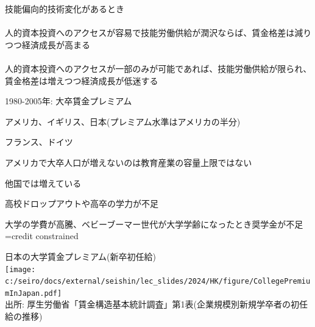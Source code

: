 \begin{frame}{}
技能偏向的技術変化があるとき\\~\\
\pause
人的資本投資へのアクセスが容易で技能労働供給が潤沢ならば、賃金格差は減りつつ経済成長が高まる\\~\\
\pause
人的資本投資へのアクセスが一部のみが可能であれば、技能労働供給が限られ、賃金格差は増えつつ経済成長が低迷する
\begin{dinglist}{43}
\vspace{1.0ex}\setlength{\itemsep}{1.0ex}\setlength{\baselineskip}{12pt}
\pause
\item	1980-2005年: 大卒賃金プレミアム
\begin{description}
\vspace{1.0ex}\setlength{\itemsep}{1.0ex}\setlength{\baselineskip}{12pt}	
\item[拡大]	アメリカ、イギリス、日本(プレミアム水準はアメリカの半分)
\item[変化なし]	フランス、ドイツ\\[2ex]
\end{description}
\end{dinglist}
\pause
アメリカで大卒人口が増えないのは教育産業の容量上限ではない
\begin{dinglist}{43}
\vspace{1.0ex}\setlength{\itemsep}{1.0ex}\setlength{\baselineskip}{12pt}
\pause
\item	他国では増えている
\pause
\item	高校ドロップアウトや高卒の学力が不足\citep[][p.347]{GoldinKatz2009}
\pause
\item	大学の学費が高騰、ベビーブーマー世代が大学学齢になったとき奨学金が不足=credit constrained\citep[][p.349]{GoldinKatz2009}
\end{dinglist}
\end{frame}

\begin{frame}{}
日本の大学賃金プレミアム(新卒初任給)\\
\hfil\texttt{[image: c:/seiro/docs/external/seishin/lec\_slides/2024/HK/figure/CollegePremiumInJapan.pdf]}\\
{\footnotesize 出所: 厚生労働省「賃金構造基本統計調査」第1表(企業規模別新規学卒者の初任給の推移)}
\end{frame}



